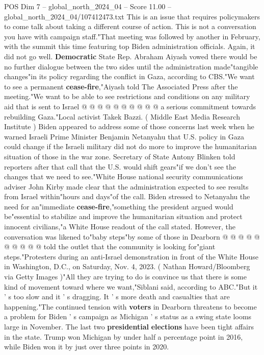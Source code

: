 \begin{textsample}{POS Dim 7 – global\_north\_2024\_04 – Score 11.00 – global\_north\_2024\_04/107412473.txt}
This is an issue that requires policymakers to come talk about taking a different course of action.
This is not a conversation you have with campaign staff."That meeting was followed by another in February, with the summit this time featuring top Biden administration officials.
Again, it did not go well. \textbf{Democratic} State Rep.
Abraham Aiyash vowed there would be no further dialogue between the two sides until the administration made"tangible changes"in its policy regarding the conflict in Gaza, according to CBS."We want to see a permanent \textbf{cease-fire},"Aiyash told The Associated Press after the meeting."We want to be able to see restrictions and conditions on any military aid that is sent to Israel @ @ @ @ @ @ @ @ @ @ a serious commitment towards rebuilding Gaza."Local activist Takek Bazzi. ( Middle East Media Research Institute ) Biden appeared to address some of those concerns last week when he warned Israeli Prime Minister Benjamin Netanyahu that U.S. policy in Gaza could change if the Israeli military did not do more to improve the humanitarian situation of those in the war zone.
Secretary of State Antony Blinken told reporters after that call that the U.S. would shift gears"if we don't see the changes that we need to see."White House national security communications adviser John Kirby made clear that the administration expected to see results from Israel within"hours and days"of the call.
Biden stressed to Netanyahu the need for an"immediate \textbf{cease-fire},"something the president argued would be"essential to stabilize and improve the humanitarian situation and protect innocent civilians,"a White House readout of the call stated.
However, the conversation was likened to"baby steps"by some of those in Dearborn @ @ @ @ @ @ @ @ @ @ told the outlet that the community is looking for"giant steps."Protesters during an anti-Israel demonstration in front of the White House in Washington, D.C., on Saturday, Nov. 4, 2023. ( Nathan Howard/Bloomberg via Getty Images )"All they are trying to do is convince us that there is some kind of movement toward where we want,"Siblani said, according to ABC."But it ' s too slow and it ' s dragging.
It ' s more death and casualties that are happening."The continued tension with \textbf{voters} in Dearborn threatens to become a problem for Biden ' s campaign as Michigan ' s status as a swing state looms large in November.
The last two \textbf{presidential} \textbf{elections} have been tight affairs in the state.
Trump won Michigan by under half a percentage point in 2016, while Biden won it by just over three points in 2020.

\end{textsample}
